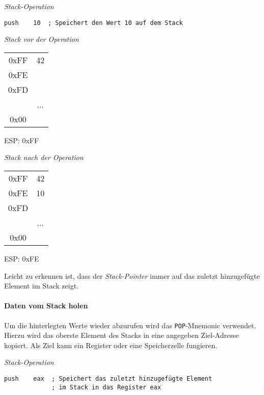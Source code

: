 
\textit{Stack-Operation}
\begin{lstlisting}
push    10  ; Speichert den Wert 10 auf dem Stack
\end{lstlisting}

\begin{multicols}{2}
\begin{minipage}{5cm}
\emph{Stack vor der Operation}\\
\begin{tabular}{c|c|}
	\cline{2-2}
   0xFF & 42\\ \cline{2-2}
   0xFE & \\ \cline{2-2}
   0xFD & \\ \cline{2-2}
	      & ... \\ \cline{2-2}
	 0x00 & \\ \cline{2-2}
\end{tabular}
ESP: 0xFF
\end{minipage}

\begin{minipage}{5cm}
\emph{Stack nach der Operation}\\
\begin{tabular}{c|c|}
	\cline{2-2}
   0xFF & 42\\ \cline{2-2}
   0xFE & 10\\ \cline{2-2}
   0xFD & \\ \cline{2-2}
	      & ... \\ \cline{2-2}
	 0x00 & \\ \cline{2-2}
\end{tabular}
ESP: 0xFE
\end{minipage}
\end{multicols}

Leicht zu erkennen ist, dass der \textit{Stack-Pointer} immer auf das zuletzt hinzugefügte Element im Stack zeigt.


\paragraph{Daten vom Stack holen\newline}
Um die hinterlegten Werte wieder abzurufen wird das \texttt{POP}-Mnemonic verwendet.
Hierzu wird das oberste Element des Stacks in eine angegeben Ziel-Adresse kopiert. Als Ziel kann ein Register oder eine Speicherzelle fungieren.  

\textit{Stack-Operation}
\begin{lstlisting}
push    eax  ; Speichert das zuletzt hinzugefügte Element
             ; im Stack in das Register eax
\end{lstlisting}

